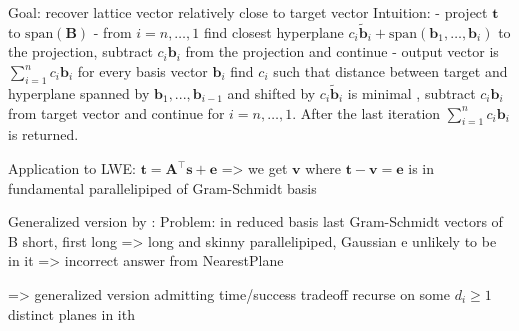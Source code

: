 Goal: recover lattice vector relatively close to target vector
Intuition:
 - project $\mathbf{t}$ to $\text{span}(\mathbf{B})$
 - from $i=n, \dots, 1$ find closest hyperplane $c_i \tilde{\mathbf{b}}_i + \text{span}(\mathbf{b}_1, \dots, \mathbf{b}_i)$ to the projection, subtract $c_i \mathbf{b}_i$ from the projection and continue %
 - output vector is $\sum_{i=1}^n c_i \mathbf{b}_i$
for every basis vector $\mathbf{b}_i$ find $c_i$ such that distance between target and hyperplane spanned by $\mathbf{b}_1, ..., \mathbf{b}_{i-1}$ and shifted by $c_i \tilde{\mathbf{b}}_i$  is minimal %
, subtract $c_i \mathbf{b}_i$ from target vector and continue for $i=n, \dots, 1$. After the last iteration $\sum_{i=1}^n  c_i \mathbf{b}_i$ is returned. 

Application to LWE: $\mathbf{t} = \mathbf{A}^\intercal\mathbf{s}+\mathbf{e}$ => we get $\mathbf{v}$ where $\mathbf{t}- \mathbf{v} = \mathbf{e}$ is in fundamental parallelipiped of Gram-Schmidt basis


Generalized version by \cite{LP11}:
Problem: in reduced basis last Gram-Schmidt vectors of B short, first long => long and skinny parallelipiped, Gaussian e unlikely to be in it => incorrect answer from NearestPlane

=> generalized version admitting time/success tradeoff
recurse on some $d_i \geq 1$ distinct planes in ith 

